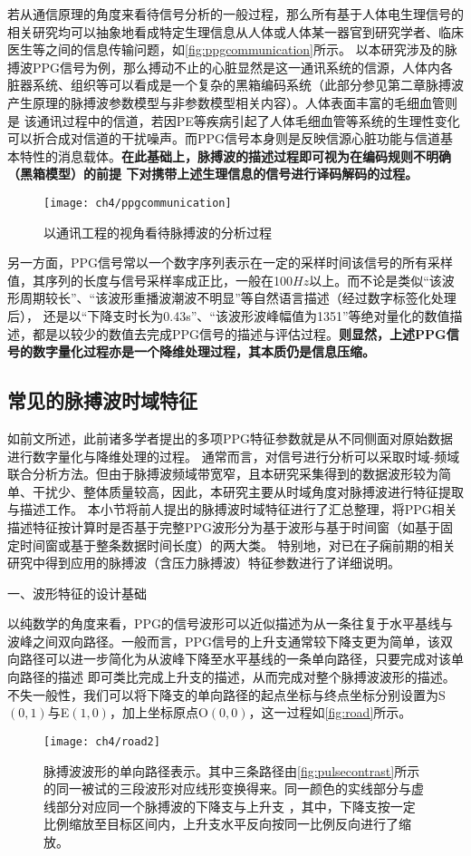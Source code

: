 若从通信原理的角度来看待信号分析的一般过程，那么所有基于人体电生理信号的相关研究均可以抽象地看成特定生理信息从人体或人体某一器官到研究学者、临床医生等之间的信息传输问题，如\autoref{fig:ppgcommunication}所示。
以本研究涉及的脉搏波PPG信号为例，那么搏动不止的心脏显然是这一通讯系统的信源，人体内各脏器系统、组织等可以看成是一个复杂的黑箱编码系统（此部分参见第二章脉搏波产生原理的脉搏波参数模型与非参数模型相关内容）。人体表面丰富的毛细血管则是
该通讯过程中的信道，若因PE等疾病引起了人体毛细血管等系统的生理性变化可以折合成对信道的干扰噪声。而PPG信号本身则是反映信源心脏功能与信道基本特性的消息载体。\textbf{在此基础上，脉搏波的描述过程即可视为在编码规则不明确（黑箱模型）的前提
下对携带上述生理信息的信号进行译码解码的过程。}
\begin{figure}[htbp]
    \centering
    \texttt{[image: ch4/ppgcommunication]}
    \caption{\label{fig:ppgcommunication}以通讯工程的视角看待脉搏波的分析过程}
\end{figure}

另一方面，PPG信号常以一个数字序列表示在一定的采样时间该信号的所有采样值，其序列的长度与信号采样率成正比，一般在100$Hz$以上。而不论是类似“该波形周期较长”、“该波形重播波潮波不明显”等自然语言描述（经过数字标签化处理后），
还是以“下降支时长为0.43s”、“该波形波峰幅值为1351”等绝对量化的数值描述，都是以较少的数值去完成PPG信号的描述与评估过程。\textbf{则显然，上述PPG信号的数字量化过程亦是一个降维处理过程，其本质仍是信息压缩。}

\subsection{常见的脉搏波时域特征}
如前文所述，此前诸多学者提出的多项PPG特征参数就是从不同侧面对原始数据进行数字量化与降维处理的过程。
通常而言，对信号进行分析可以采取时域-频域联合分析方法。但由于脉搏波频域带宽窄，且本研究采集得到的数据波形较为简单、干扰少、整体质量较高，因此，本研究主要从时域角度对脉搏波进行特征提取与描述工作。
本小节将前人提出的脉搏波时域特征进行了汇总整理，将PPG相关描述特征按计算时是否基于完整PPG波形分为基于波形与基于时间窗（如基于固定时间窗或基于整条数据时间长度）的两大类。
特别地，对已在子痫前期的相关研究中得到应用的脉搏波（含压力脉搏波）特征参数进行了详细说明。

一、波形特征的设计基础

以纯数学的角度来看，PPG的信号波形可以近似描述为从一条往复于水平基线与波峰之间双向路径。一般而言，PPG信号的上升支通常较下降支更为简单，该双向路径可以进一步简化为从波峰下降至水平基线的一条单向路径，只要完成对该单向路径的描述
即可类比完成上升支的描述，从而完成对整个脉搏波波形的描述。不失一般性，我们可以将下降支的单向路径的起点坐标与终点坐标分别设置为S$(0,1)$与E$(1,0)$，加上坐标原点O$(0,0)$，这一过程如\autoref{fig:road}所示。
\begin{figure}[htbp]
    \centering
    \texttt{[image: ch4/road2]}
    \caption[脉搏波波形的单向路径表示]{\label{fig:road}脉搏波波形的单向路径表示。其中三条路径由\autoref{fig:pulsecontrast}所示的同一被试的三段波形对应线形变换得来。同一颜色的实线部分与虚线部分对应同一个脉搏波的下降支与上升支
    ，其中，下降支按一定比例缩放至目标区间内，上升支水平反向按同一比例反向进行了缩放。}
\end{figure}

